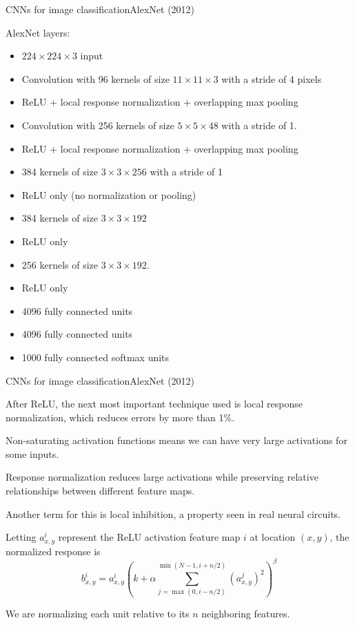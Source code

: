 \documentclass{beamer}
\begin{document}
\begin{frame}{CNNs for image classification}{AlexNet (2012)}

  AlexNet layers:
  \begin{itemize}
  \item $224 \times 224 \times 3$ input
  \item Convolution with 96 kernels of size $11 \times 11 \times 3$ with a stride of 4 pixels
  \item ReLU + local response normalization + overlapping max pooling
  \item Convolution with 256 kernels of size $5\times 5\times 48$ with a stride of 1.
  \item ReLU + local response normalization + overlapping max pooling
  \item 384 kernels of size $3\times 3\times 256$ with a stride of 1
  \item ReLU only (no normalization or pooling)
  \item 384 kernels of size $3\times 3\times 192$
  \item ReLU only
  \item 256 kernels of size $3\times 3\times 192$.
  \item ReLU only
  \item 4096 fully connected units
  \item 4096 fully connected units
  \item 1000 fully connected softmax units
  \end{itemize}
  
\end{frame}


\begin{frame}{CNNs for image classification}{AlexNet (2012)}

  After ReLU, the next most important technique used is
  \alert{local response normalization}, which reduces errors by more than 1\%.

  \medskip

  Non-saturating activation functions means we can have very large
  activations for some inputs.

  \medskip
  
  Response normalization \alert{reduces large activations} while
  \alert{preserving relative relationships} between different feature
  maps.

  \medskip
  
  Another term for this is \alert{local inhibition}, a property seen
  in real neural circuits.

  \medskip
  
  Letting $a^{i}_{x,y}$ represent the ReLU activation feature map $i$
  at location $(x,y)$, the normalized response is
  $$ b^{i}_{x,y} = a^{i}_{x,y} \left( k + \alpha \sum_{j = \max(0,
    i-n/2)}^{\min( N-1,i+n/2)}\left(a^{j}_{x,y}\right)^2
  \right)^\beta $$

  \medskip

  We are normalizing each unit
  relative to its $n$ neighboring features.

\end{frame}
\end{document}
